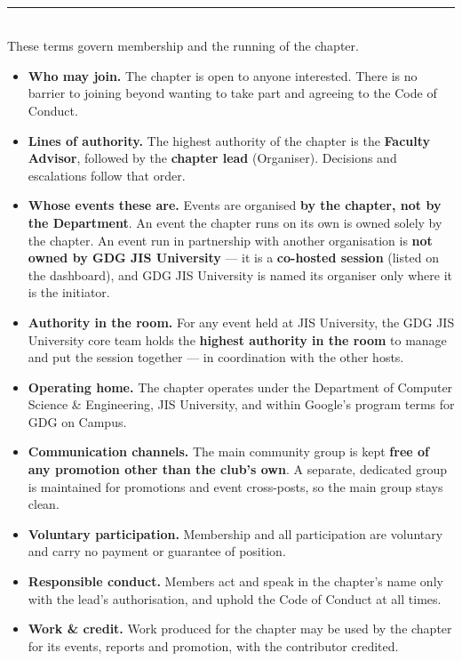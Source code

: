 \documentclass[11pt,a4paper]{article}
\newcommand{\pill}[2]{\tikz[baseline]{\node[fill=#1,text=white,font=\bfseries\small,%
  rounded corners=3pt,inner xsep=7pt,inner ysep=2.5pt]{#2};}}
\begin{document}
\begin{tcolorbox}[enhanced,breakable,colback=white,colframe=Line,boxrule=0.6pt,arc=5pt,
    left=14pt,right=14pt,top=12pt,bottom=12pt,borderline west={3.5pt}{0pt}{GRed},
    before skip=8pt,after skip=12pt]
  {\pill{GRed}{02}}\;\\[8pt]
  {\color{Line}\rule{\linewidth}{0.5pt}}\\[7pt]
  
These terms govern membership and the running of the chapter.
\begin{itemize}[leftmargin=1.4em,itemsep=3pt,topsep=2pt]
  \item \textbf{Who may join.} The chapter is open to anyone interested. There is no barrier to joining
        beyond wanting to take part and agreeing to the Code of Conduct.
  \item \textbf{Lines of authority.} The highest authority of the chapter is the \textbf{Faculty
        Advisor}, followed by the \textbf{chapter lead} (Organiser). Decisions and escalations follow
        that order.
  \item \textbf{Whose events these are.} Events are organised \textbf{by the chapter, not by the
        Department}. An event the chapter runs on its own is owned solely by the chapter. An event run
        in partnership with another organisation is \textbf{not owned by GDG JIS University} — it is a
        \textbf{co-hosted session} (listed on the dashboard), and GDG JIS University is named its
        organiser only where it is the initiator.
  \item \textbf{Authority in the room.} For any event held at JIS University, the GDG JIS University
        core team holds the \textbf{highest authority in the room} to manage and put the session
        together — in coordination with the other hosts.
  \item \textbf{Operating home.} The chapter operates under the Department of Computer Science \&
        Engineering, JIS University, and within Google's program terms for GDG on Campus.
  \item \textbf{Communication channels.} The main community group is kept \textbf{free of any promotion
        other than the club's own}. A separate, dedicated group is maintained for promotions and event
        cross-posts, so the main group stays clean.
  \item \textbf{Voluntary participation.} Membership and all participation are voluntary and carry no
        payment or guarantee of position.
  \item \textbf{Responsible conduct.} Members act and speak in the chapter's name only with the lead's
        authorisation, and uphold the Code of Conduct at all times.
  \item \textbf{Work \& credit.} Work produced for the chapter may be used by the chapter for its
        events, reports and promotion, with the contributor credited.
\end{itemize}
\end{tcolorbox}
\end{document}
